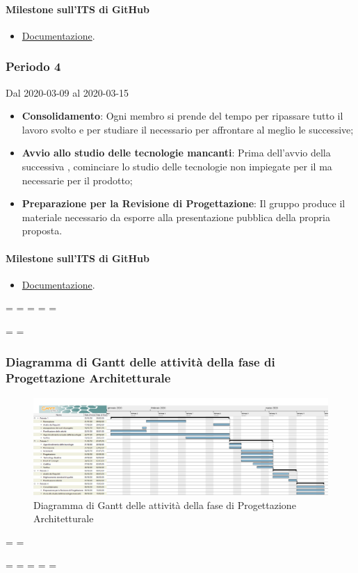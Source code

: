 \paragraph{Milestone sull'ITS di GitHub}
\begin{itemize}
	\item \href{https://github.com/qb-team/Stalker-Documentazione/milestone/10}{Documentazione}.
\end{itemize}

\subsubsection{Periodo 4} 
Dal 2020-03-09 al 2020-03-15
\begin{itemize}
	\item \textbf{Consolidamento}: Ogni membro si prende del tempo per ripassare tutto il lavoro svolto e per studiare il necessario per affrontare al meglio le  successive;
	\item \textbf{Avvio allo studio delle tecnologie mancanti}: Prima dell'avvio della successiva , cominciare lo studio delle tecnologie non impiegate per il  ma necessarie per il prodotto;
	\item \textbf{Preparazione per la Revisione di Progettazione}: Il gruppo produce il materiale necessario da esporre alla presentazione pubblica della propria proposta.
\end{itemize}
\paragraph{Milestone sull'ITS di GitHub}
\begin{itemize}
	\item \href{https://github.com/qb-team/Stalker-Documentazione/milestone/14}{Documentazione}.
\end{itemize}

\newpage
\paperwidth=\pdfpageheight
\paperheight=\pdfpagewidth
\pdfpageheight=\paperheight
\pdfpagewidth=\paperwidth
\headwidth=\textheight

\begingroup 
\vsize=\textwidth
\hsize=\textheight

\subsubsection{Diagramma di Gantt delle attività della fase di Progettazione Architetturale}
\pagestyle{empty}
\begin{figure}[h]
	\centering
	\includegraphics[scale=0.38]{Sezioni/DiagrammiGantt/ProgettazioneArchitetturale.png}
	\caption{Diagramma di Gantt delle attività della fase di Progettazione Architetturale}	
\end{figure}

\textwidth=\hsize
\textheight=\vsize

\endgroup
\newpage
\paperwidth=\pdfpageheight
\paperheight=\pdfpagewidth
\pdfpageheight=\paperheight
\pdfpagewidth=\paperwidth
\headwidth=\textwidth
